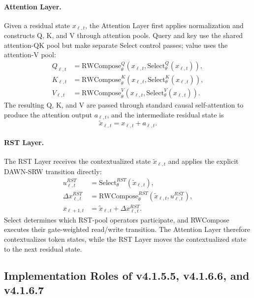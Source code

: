 \documentclass{article}
\begin{document}
\paragraph{Attention Layer.}
Given a residual state \(x_{\ell,t}\), the Attention Layer first applies normalization and constructs Q, K, and V through attention pools. Query and key use the shared attention-QK pool but make separate Select control passes; value uses the attention-V pool:
\begin{align}
    Q_{\ell,t} &= \mathrm{RWCompose}^{Q}_\theta(x_{\ell,t},\mathrm{Select}^{Q}_\theta(x_{\ell,t})), \\
    K_{\ell,t} &= \mathrm{RWCompose}^{K}_\theta(x_{\ell,t},\mathrm{Select}^{K}_\theta(x_{\ell,t})), \\
    V_{\ell,t} &= \mathrm{RWCompose}^{V}_\theta(x_{\ell,t},\mathrm{Select}^{V}_\theta(x_{\ell,t})).
\end{align}
The resulting Q, K, and V are passed through standard causal self-attention to produce the attention output \(a_{\ell,t}\), and the intermediate residual state is
\begin{equation}
    \tilde{x}_{\ell,t}=x_{\ell,t}+a_{\ell,t}.
\end{equation}

\paragraph{RST Layer.}
The RST Layer receives the contextualized state \(\tilde{x}_{\ell,t}\) and applies the explicit DAWN-SRW transition directly:
\begin{align}
    u^{RST}_{\ell,t} &= \mathrm{Select}^{RST}_\theta(\tilde{x}_{\ell,t}), \\
    \Delta x^{RST}_{\ell,t} &= \mathrm{RWCompose}^{RST}_\theta(\tilde{x}_{\ell,t},u^{RST}_{\ell,t}), \\
    x_{\ell+1,t} &= \tilde{x}_{\ell,t}+\Delta x^{RST}_{\ell,t} .
\end{align}
Select determines which RST-pool operators participate, and RWCompose executes their gate-weighted read/write transition. The Attention Layer therefore contextualizes token states, while the RST Layer moves the contextualized state to the next residual state.

\subsection{Implementation Roles of v4.1.5.5, v4.1.6.6, and v4.1.6.7}
\label{sec:implementation_roles}
\end{document}
